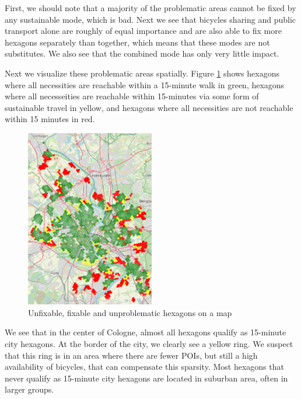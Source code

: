 First, we should note that a majority of the problematic areas cannot be fixed by any sustainable mode, which is bad.
Next we see that bicycles sharing and public transport alone are roughly of equal importance and are also able to fix more hexagons separately than together, which means that these modes are not substitutes.
We also see that the combined mode has only very little impact.

Next we visualize these problematic areas spatially.
Figure \ref{fig:problematic_hexagons} shows hexagons where all necessities are reachable within a 15-minute walk in green, hexagons where all necesseities are reachable within 15-minutes via some form of sustainable travel in yellow, and hexagons where all necessities are not reachable within 15 minutes in red.

\begin{figure}
  \begin{center}
    \includegraphics[width=0.50\textwidth]{Figures/results/problematic_hexagons/problematic_hexagons}
  \end{center}
  \caption{Unfixable, fixable and unproblematic hexagons on a map}
  \label{fig:problematic_hexagons}
\end{figure}

We see that in the center of Cologne, almost all hexagons qualify as 15-minute city hexagons. 
At the border of the city, we clearly see a yellow ring.
We suspect that this ring is in an area where there are fewer POIs, but still a high availability of bicycles, that can compensate this sparsity.
Most hexagons that never qualify as 15-minute city hexagons are located in suburban area, often in larger groups.

